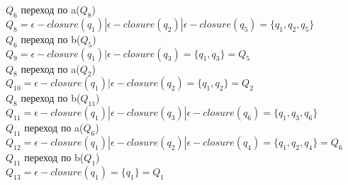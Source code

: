\documentclass[a4paper,12pt]{article}
\begin{document}
$Q_6$ переход по a($Q_8$)\\
$Q_8=\epsilon-closure(q_1)|\epsilon-closure(q_2)|\epsilon-closure(q_5)=\lbrace q_1,q_2,q_5 \rbrace$\\
$Q_6$ переход по b($Q_5$)\\
$Q_9=\epsilon-closure(q_1)|\epsilon-closure(q_3)=\lbrace q_1,q_3 \rbrace=Q_5$\\


$Q_8$ переход по a($Q_2$)\\
$Q_{10}=\epsilon-closure(q_1)|\epsilon-closure(q_2)=\lbrace q_1,q_2 \rbrace=Q_2$\\
$Q_8$ переход по b($Q_{11}$)\\
$Q_{11}=\epsilon-closure(q_1)|\epsilon-closure(q_3)|\epsilon-closure(q_6)=\lbrace q_1,q_3,q_6 \rbrace$\\


$Q_{11}$ переход по a($Q_{6}$)\\
$Q_{12}=\epsilon-closure(q_1)|\epsilon-closure(q_2)|\epsilon-closure(q_4)=\lbrace q_1,q_2,q_4 \rbrace=Q_6$\\
$Q_{11}$ переход по b($Q_{1}$)\\
$Q_{13}=\epsilon-closure(q_1)=\lbrace q_1 \rbrace=Q_1$\\
\end{document}
